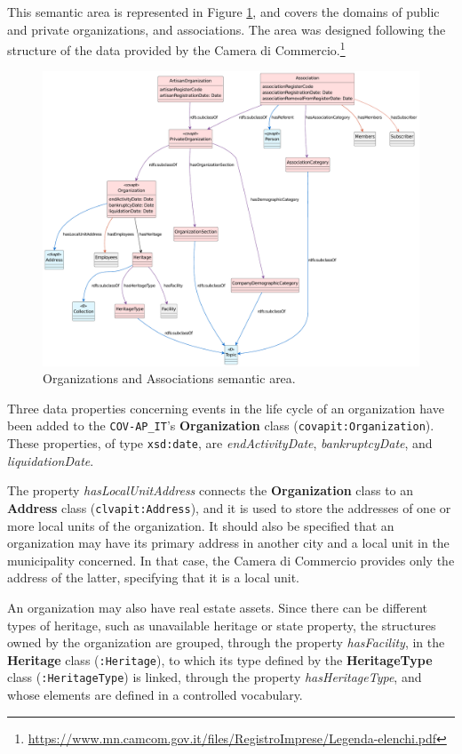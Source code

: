 This semantic area is represented in Figure \ref{fig:organizations-sa}, and covers the domains of public and private organizations, and associations. The area was designed following the structure of the data provided by the Camera di Commercio.\footnote{\url{https://www.mn.camcom.gov.it/files/RegistroImprese/Legenda-elenchi.pdf}}

\begin{figure}[!ht]
  \centering
  \includegraphics[width=\columnwidth]{images/ontoim/organizations}
  \caption{Organizations and Associations semantic area.}
  \label{fig:organizations-sa}
\end{figure}

Three data properties concerning events in the life cycle of an organization have been added to the \verb#COV-AP_IT#'s \textbf{Organization} class (\verb#covapit:Organization#). These properties, of type \verb#xsd:date#, are \textit{endActivityDate}, \textit{bankruptcyDate}, and \textit{liquidationDate}.

The property \textit{hasLocalUnitAddress} connects the \textbf{Organization} class to an \textbf{Address} class (\verb#clvapit:Address#), and it is used to store the addresses of one or more local units of the organization. It should also be specified that an organization may have its primary address in another city and a local unit in the municipality concerned. In that case, the Camera di Commercio provides only the address of the latter, specifying that it is a local unit.

An organization may also have real estate assets. Since there can be different types of heritage, such as unavailable heritage or state property, the structures owned by the organization are grouped, through the property \textit{hasFacility}, in the \textbf{Heritage} class (\verb#:Heritage#), to which its type defined by the \textbf{HeritageType} class (\verb#:HeritageType#) is linked, through the property \textit{hasHeritageType}, and whose elements are defined in a controlled vocabulary.

